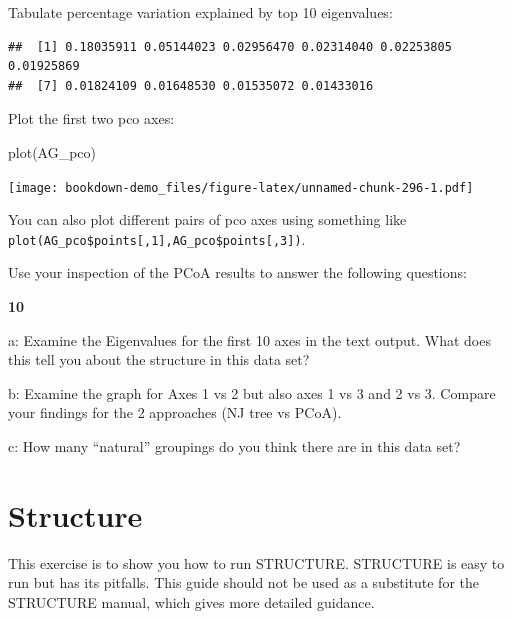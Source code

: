 \documentclass[
]{book}
\makeatletter
\newenvironment{Shaded}{\begin{snugshade}}{\end{snugshade}}
\newcommand{\DecValTok}[1]{\textcolor[rgb]{0.00,0.00,0.81}{#1}}
\newcommand{\FunctionTok}[1]{\textcolor[rgb]{0.00,0.00,0.00}{#1}}
\newcommand{\NormalTok}[1]{#1}
\newcommand{\OtherTok}[1]{\textcolor[rgb]{0.56,0.35,0.01}{#1}}
\newcommand{\SpecialCharTok}[1]{\textcolor[rgb]{0.00,0.00,0.00}{#1}}
\newenvironment{kframe}{%
\medskip{}
\setlength{\fboxsep}{.8em}
 \def\at@end@of@kframe{}%
 \ifinner\ifhmode%
  \def\at@end@of@kframe{\end{minipage}}%
  \begin{minipage}{\columnwidth}%
 \fi\fi%
 \def\FrameCommand##1{\hskip\@totalleftmargin \hskip-\fboxsep
 \colorbox{shadecolor}{##1}\hskip-\fboxsep
     \hskip-\linewidth \hskip-\@totalleftmargin \hskip\columnwidth}%
 \MakeFramed {\advance\hsize-\width
   \@totalleftmargin\z@ \linewidth\hsize
   \@setminipage}}%
 {\par\unskip\endMakeFramed%
 \at@end@of@kframe}
\newenvironment{rmdblock}[1]
  {
  \begin{itemize}
  \renewcommand{\labelitemi}{
    \raisebox{-.7\height}[0pt][0pt]{
      {\setkeys{Gin}{width=3em,keepaspectratio}\texttt{[image: images/\#1]}}
    }
  }
  \setlength{\fboxsep}{1em}
  \begin{kframe}
  \item
  }
  {
  \end{kframe}
  \end{itemize}
  }
\newenvironment{rmdquiz}
  {\begin{rmdblock}{quiz}}
  {\end{rmdblock}}
\makeatother
\begin{document}
Tabulate percentage variation explained by top 10 eigenvalues:

\begin{Shaded}
\end{Shaded}

\begin{verbatim}
##  [1] 0.18035911 0.05144023 0.02956470 0.02314040 0.02253805 0.01925869
##  [7] 0.01824109 0.01648530 0.01535072 0.01433016
\end{verbatim}

Plot the first two pco axes:

\begin{Shaded}
\begin{Highlighting}[]
\FunctionTok{plot}\NormalTok{(AG\_pco)}
\end{Highlighting}
\end{Shaded}

\texttt{[image: bookdown-demo\_files/figure-latex/unnamed-chunk-296-1.pdf]}

You can also plot different pairs of pco axes using something like \texttt{plot(AG\_pco\$points{[},1{]},AG\_pco\$points{[},3{]})}.

Use your inspection of the PCoA results to answer the following questions:

\begin{rmdquiz}
\textbf{10}

a: Examine the Eigenvalues for the first 10 axes in the text output. What does this tell you about the structure in this data set?

b: Examine the graph for Axes 1 vs 2 but also axes 1 vs 3 and 2 vs 3. Compare your findings for the 2 approaches (NJ tree vs PCoA).

c: How many ``natural'' groupings do you think there are in this data set?
\end{rmdquiz}

\hypertarget{structure}{%
\section{Structure}\label{structure}}

This exercise is to show you how to run STRUCTURE. STRUCTURE is easy to run but has its pitfalls. This guide should not be used as a substitute for the STRUCTURE manual, which gives more detailed guidance.
\end{document}
